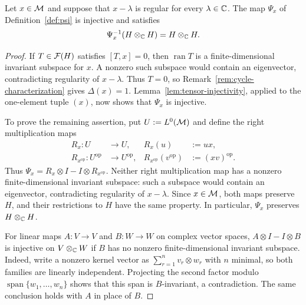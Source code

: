 \begin{lemma}\label{lem:tensor-l2-recovery}
Let $x\in\mathcal M$ and suppose that $x-\lambda$ is regular for every $\lambda\in\mathbb C$.
The map $\Psi_x$ of Definition~\ref{def:psi} is injective and satisfies
\[
 \Psi_x^{-1}(H\otimes_{\mathbb C}H)=H\otimes_{\mathbb C}H.
\]
\end{lemma}
\begin{proof}
If $T\in\mathcal F(H)$ satisfies $[T,x]=0$, then $\operatorname{ran}T$ is a finite-dimensional invariant subspace for $x$.
A nonzero such subspace would contain an eigenvector, contradicting regularity of $x-\lambda$.
Thus $T=0$, so Remark~\ref{rem:cycle-characterization} gives $\Delta(x)=1$.
Lemma~\ref{lem:tensor-injectivity}, applied to the one-element tuple $(x)$, now shows that $\Psi_x$ is injective.

To prove the remaining assertion, put $U:=L^0(\mathcal M)$ and define the right multiplication maps
\[
 \begin{aligned}
 R_x:U&\longrightarrow U,& R_x(u)&:=ux,\\
 R_{x^{\mathrm{op}}}:U^{\mathrm{op}}&\longrightarrow U^{\mathrm{op}},&
 R_{x^{\mathrm{op}}}(v^{\mathrm{op}})&:=(xv)^{\mathrm{op}}.
 \end{aligned}
\]
Thus $\Psi_x=R_x\otimes I-I\otimes R_{x^{\mathrm{op}}}$.
Neither right multiplication map has a nonzero finite-dimensional invariant subspace: such a subspace would contain an eigenvector, contradicting regularity of $x-\lambda$.
Since $x\in\mathcal M$, both maps preserve $H$, and their restrictions to $H$ have the same property.
In particular, $\Psi_x$ preserves $H\otimes_{\mathbb C}H$.

For linear maps $A:V\to V$ and $B:W\to W$ on complex vector spaces, $A\otimes I-I\otimes B$ is injective on $V\otimes_{\mathbb C}W$ if $B$ has no nonzero finite-dimensional invariant subspace.
Indeed, write a nonzero kernel vector as $\sum_{r=1}^n v_r\otimes w_r$ with $n$ minimal, so both families are linearly independent.
Projecting the second factor modulo $\operatorname{span}\{w_1,\ldots,w_n\}$ shows that this span is $B$-invariant, a contradiction.
The same conclusion holds with $A$ in place of $B$.


\end{proof}
